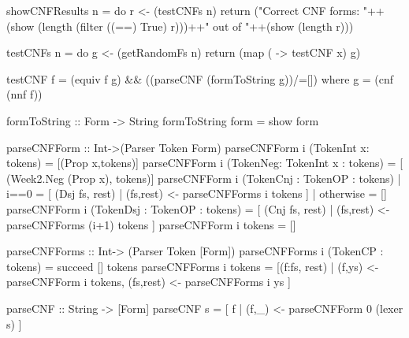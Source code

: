 \documentclass{article}
\begin{document}
\begin{code}
showCNFResults n = do
		      r <- (testCNFs n)
		      return ("Correct CNF forms: "++(show (length (filter ((==)
				True) r)))++" out of "++(show (length r)))

testCNFs n = do
		      g <- (getRandomFs n)
		      return (map ( \x -> testCNF x) g)
 
testCNF f = (equiv f g) && ((parseCNF (formToString g))/=[]) where g = (cnf (nnf f))
 
formToString :: Form -> String
formToString form = show form

parseCNFForm :: Int->(Parser Token Form) 
parseCNFForm i (TokenInt x: tokens) = [(Prop x,tokens)]
parseCNFForm i (TokenNeg: TokenInt x : tokens) = [ (Week2.Neg (Prop x), tokens)]
parseCNFForm i (TokenCnj : TokenOP : tokens) | i==0 = [ (Dsj fs, rest) | (fs,rest) <- parseCNFForms i tokens ]
					     | otherwise = []
parseCNFForm i (TokenDsj : TokenOP : tokens) = [ (Cnj fs, rest) | (fs,rest) <- parseCNFForms (i+1) tokens ]
parseCNFForm i tokens = []

parseCNFForms :: Int-> (Parser Token [Form]) 
parseCNFForms i (TokenCP : tokens) = succeed [] tokens
parseCNFForms i tokens = [(f:fs, rest) | (f,ys) <- parseCNFForm i tokens, (fs,rest) <- parseCNFForms i ys ]

parseCNF :: String -> [Form]
parseCNF s = [ f | (f,_) <- parseCNFForm 0 (lexer s) ]
\end{code}
\end{document}

